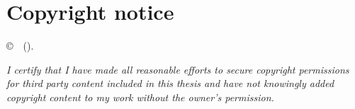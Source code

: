 \chapter*{Copyright notice}

\noindent\copyright\ \thesisauthor\ (\thesisyear).

\bigskip

\bigskip

\noindent \textit{I certify that I have made all reasonable efforts to secure copyright
permissions for third party content included in this thesis and have not
knowingly added copyright content to my work without the owner's permission.
}
\cleardoublepage
